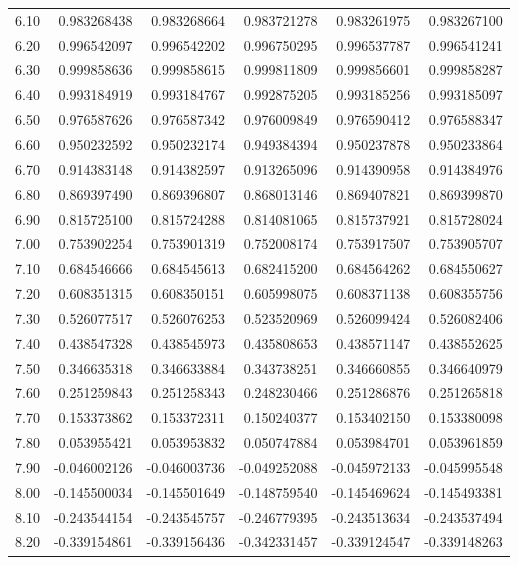 \documentclass[11pt,a4paper]{article}
\begin{document}
\begin{longtable}{rrrrrr}
6.10 & 0.983268438 & 0.983268664 & 0.983721278 & 0.983261975 & 0.983267100 \\
6.20 & 0.996542097 & 0.996542202 & 0.996750295 & 0.996537787 & 0.996541241 \\
6.30 & 0.999858636 & 0.999858615 & 0.999811809 & 0.999856601 & 0.999858287 \\
6.40 & 0.993184919 & 0.993184767 & 0.992875205 & 0.993185256 & 0.993185097 \\
6.50 & 0.976587626 & 0.976587342 & 0.976009849 & 0.976590412 & 0.976588347 \\
6.60 & 0.950232592 & 0.950232174 & 0.949384394 & 0.950237878 & 0.950233864 \\
6.70 & 0.914383148 & 0.914382597 & 0.913265096 & 0.914390958 & 0.914384976 \\
6.80 & 0.869397490 & 0.869396807 & 0.868013146 & 0.869407821 & 0.869399870 \\
6.90 & 0.815725100 & 0.815724288 & 0.814081065 & 0.815737921 & 0.815728024 \\
7.00 & 0.753902254 & 0.753901319 & 0.752008174 & 0.753917507 & 0.753905707 \\
7.10 & 0.684546666 & 0.684545613 & 0.682415200 & 0.684564262 & 0.684550627 \\
7.20 & 0.608351315 & 0.608350151 & 0.605998075 & 0.608371138 & 0.608355756 \\
7.30 & 0.526077517 & 0.526076253 & 0.523520969 & 0.526099424 & 0.526082406 \\
7.40 & 0.438547328 & 0.438545973 & 0.435808653 & 0.438571147 & 0.438552625 \\
7.50 & 0.346635318 & 0.346633884 & 0.343738251 & 0.346660855 & 0.346640979 \\
7.60 & 0.251259843 & 0.251258343 & 0.248230466 & 0.251286876 & 0.251265818 \\
7.70 & 0.153373862 & 0.153372311 & 0.150240377 & 0.153402150 & 0.153380098 \\
7.80 & 0.053955421 & 0.053953832 & 0.050747884 & 0.053984701 & 0.053961859 \\
7.90 & -0.046002126 & -0.046003736 & -0.049252088 & -0.045972133 & -0.045995548 \\
8.00 & -0.145500034 & -0.145501649 & -0.148759540 & -0.145469624 & -0.145493381 \\
8.10 & -0.243544154 & -0.243545757 & -0.246779395 & -0.243513634 & -0.243537494 \\
8.20 & -0.339154861 & -0.339156436 & -0.342331457 & -0.339124547 & -0.339148263 \\

\end{longtable}
\end{document}
